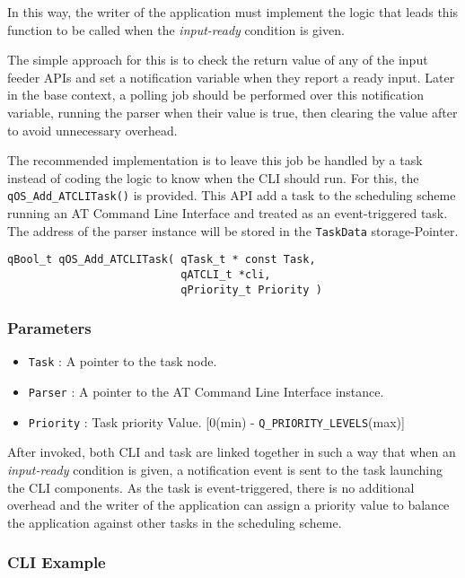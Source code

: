 In this way, the writer of the application must implement the logic that leads this function to be called when the \textit{input-ready} condition is given.

The simple approach for this is to check the return value of any of the input feeder APIs and set a notification variable when they report a ready input. Later in the base context, a polling job should be performed over this notification variable, running the parser when their value is true, then clearing the value after to avoid unnecessary overhead. 

The recommended implementation is to leave this job be handled by a task instead of coding the logic to know when the CLI should run. For this, the \lstinline{qOS_Add_ATCLITask()} is provided. This API  add a task to the scheduling scheme running an AT Command Line Interface and treated as an event-triggered task. The address of the parser instance will be stored in the \lstinline{TaskData} storage-Pointer.
\medskip

\begin{lstlisting}[style=CStyle]
qBool_t qOS_Add_ATCLITask( qTask_t * const Task, 
                           qATCLI_t *cli, 
                           qPriority_t Priority )
\end{lstlisting}

\subsubsection*{Parameters}
\begin{itemize}
    \item \lstinline{Task} : A pointer to the task node. 
    \item \lstinline{Parser} :  A pointer to the AT Command Line Interface instance.
    \item \lstinline{Priority} : Task priority Value. [0(min) - \lstinline{Q_PRIORITY_LEVELS}(max)]
\end{itemize}

After invoked, both CLI and task are linked together in such a way that when an \textit{input-ready} condition is given, a notification event is sent to the task launching the CLI components. As the task is event-triggered, there is no additional overhead and the writer of the application can assign a priority value to balance the application against other tasks in the scheduling scheme.

\subsubsection{CLI Example}

